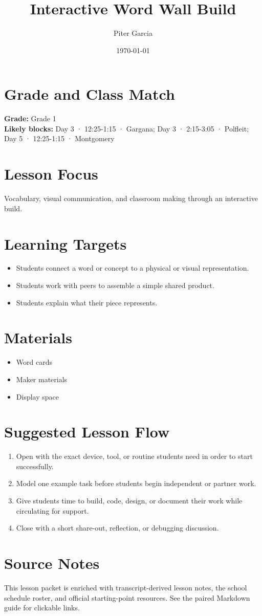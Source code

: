 \documentclass[11pt]{article}
\title{Interactive Word Wall Build}
\author{Piter Garcia}
\date{\today}
\begin{document}
\maketitle

\section*{Grade and Class Match}
\textbf{Grade:} Grade 1\\
\textbf{Likely blocks:} Day 3 · 12:25-1:15 · Gargana; Day 3 · 2:15-3:05 · Polfleit; Day 5 · 12:25-1:15 · Montgomery

\section*{Lesson Focus}
Vocabulary, visual communication, and classroom making through an interactive build.

\section*{Learning Targets}
\begin{itemize}[leftmargin=*]
\item Students connect a word or concept to a physical or visual representation.
\item Students work with peers to assemble a simple shared product.
\item Students explain what their piece represents.
\end{itemize}

\section*{Materials}
\begin{itemize}[leftmargin=*]
\item Word cards
\item Maker materials
\item Display space
\end{itemize}

\section*{Suggested Lesson Flow}
\begin{enumerate}[leftmargin=*]
\item Open with the exact device, tool, or routine students need in order to start successfully.
\item Model one example task before students begin independent or partner work.
\item Give students time to build, code, design, or document their work while circulating for support.
\item Close with a short share-out, reflection, or debugging discussion.
\end{enumerate}

\section*{Source Notes}
This lesson packet is enriched with transcript-derived lesson notes, the school schedule roster, and official starting-point resources. See the paired Markdown guide for clickable links.



\end{document}

